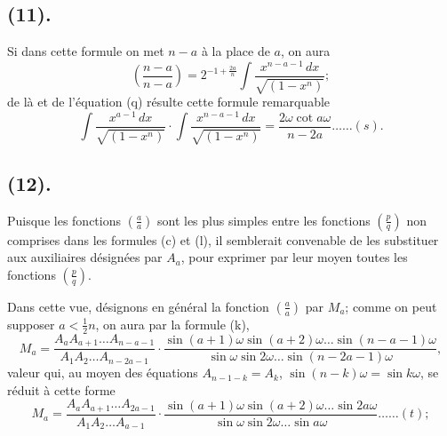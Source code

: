 \documentclass{article}
\begin{document}
\subsection*{(11).}

Si dans cette formule on met $n-a$ à la place de $a$, on aura
\[ \left(\frac{n-a}{n-a}\right)=2^{-1+\frac{2a}{n}}\int\frac{x^{n-a-1}\,dx}{\sqrt{(1-x^{n})}}; \]
de là et de l'équation (q) résulte cette formule remarquable
\[ \int\frac{x^{a-1}\,dx}{\sqrt{(1-x^{n})}}\cdot\int\frac{x^{n-a-1}\,dx}{\sqrt{(1-x^{n})}}=\frac{2\omega\cot a\omega}{n-2a}\ldots\ldots(s). \]

\subsection*{(12).}

Puisque les fonctions $\left(\frac{a}{a}\right)$ sont les plus simples entre les fonctions $\left(\frac{p}{q}\right)$ non comprises dans les formules (c) et (l), il semblerait convenable de les substituer aux auxiliaires désignées par $A_{a}$, pour exprimer par leur moyen toutes les fonctions $\left(\frac{p}{q}\right)$.

Dans cette vue, désignons en général la fonction $\left(\frac{a}{a}\right)$ par $M_{a}$; comme on peut supposer $a<\frac{1}{2}n$, on aura par la formule (k),
\[ M_{a}=\frac{A_{a}A_{a+1}\ldots A_{n-a-1}}{A_{1}A_{2}\ldots A_{n-2a-1}}\cdot\frac{\sin(a+1)\omega\sin(a+2)\omega\ldots\sin(n-a-1)\omega}{\sin\omega\sin 2\omega\ldots\sin(n-2a-1)\omega}, \]
valeur qui, au moyen des équations $A_{n-1-k}=A_{k}$, $\sin(n-k)\omega=\sin k\omega$, se réduit à cette forme
\[ M_{a}=\frac{A_{a}A_{a+1}\ldots A_{2a-1}}{A_{1}A_{2}\ldots A_{a-1}}\cdot\frac{\sin(a+1)\omega\sin(a+2)\omega\ldots\sin 2a\omega}{\sin\omega\sin 2\omega\ldots\sin a\omega}\ldots\ldots(t); \]
\end{document}
